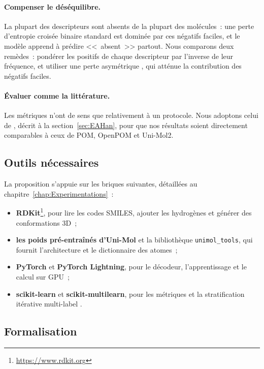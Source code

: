 \paragraph{Compenser le déséquilibre.}
La plupart des descripteurs sont absents de la plupart des molécules~: une perte d'entropie croisée binaire standard est dominée par ces négatifs faciles, et le modèle apprend à prédire <<~absent~>> partout.
Nous comparons deux remèdes~: pondérer les positifs de chaque descripteur par l'inverse de leur fréquence, et utiliser une perte asymétrique \cite{Ridnik-2021}, qui atténue la contribution des négatifs faciles.

\paragraph{Évaluer comme la littérature.}
Les métriques n'ont de sens que relativement à un protocole.
Nous adoptons celui de \cite{Han-2026}, décrit à la section~\ref{sec:EAHan}, pour que nos résultats soient directement comparables à ceux de POM, OpenPOM et Uni-Mol2.

\subsection{Outils nécessaires}
\label{sec:OutilsNecessaires}

La proposition s'appuie sur les briques suivantes, détaillées au chapitre~\ref{chap:Experimentations}~:
\begin{itemize}
   \item \textbf{RDKit}\footnote{\url{https://www.rdkit.org}}, pour lire les codes SMILES, ajouter les hydrogènes et générer des conformations 3D~;
   \item \textbf{les poids pré-entraînés d'Uni-Mol} et la bibliothèque \texttt{unimol\_tools}, qui fournit l'architecture et le dictionnaire des atomes~;
   \item \textbf{PyTorch} et \textbf{PyTorch Lightning}, pour le décodeur, l'apprentissage et le calcul sur GPU~;
   \item \textbf{scikit-learn} et \textbf{scikit-multilearn}, pour les métriques et la stratification itérative multi-label \cite{Sechidis-2011, Szymanski-2017}.
\end{itemize}

\subsection{Formalisation}
\label{sec:Formalisation}

